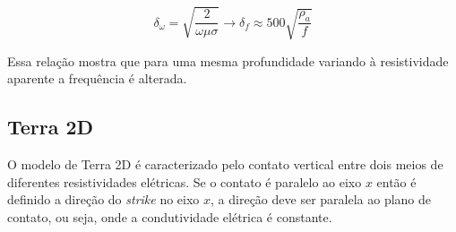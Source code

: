 	
	\begin{equation}
	 \label{rela_prof_periodo}
	 \delta_\omega = \sqrt{\frac{2}{\omega \mu \sigma}} \longrightarrow \delta_f \approx 500  \sqrt{\frac{\rho_a}{f}}
	\end{equation}
	
	Essa relação mostra que para uma mesma profundidade variando à resistividade
	aparente a frequência é alterada.
        
   
        \subsection{Terra 2D}
        
        O modelo de Terra 2D é caracterizado pelo contato vertical entre dois meios de diferentes resistividades elétricas. Se o contato é
	    paralelo ao eixo $x$ então é definido a direção do \textit{strike} no eixo $x$, a direção deve ser paralela ao plano de contato,
	    ou seja, onde a condutividade elétrica é constante.
	    
